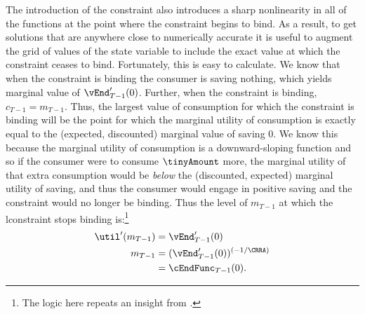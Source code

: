 \documentclass[titlepage]{\econtex}
\begin{document}

The introduction of the constraint also introduces a sharp
nonlinearity in all of the functions at the point where the constraint
begins to bind.  As a result, to get solutions that are anywhere close
to numerically accurate it is useful to augment the grid of values of
the state variable to include the exact value at which the constraint
ceases to bind.  Fortunately, this is easy to calculate.  We know that
when the constraint is binding the consumer is saving nothing, which
yields marginal value of $\vEnd_{T-1}^{\prime}(0)$. Further, when the
constraint is binding, ${c}_{T-1} = {m}_{T-1}$.  Thus, the largest
value of consumption for which the constraint is binding will be the
point for which the marginal utility of consumption is exactly equal
to the (expected, discounted) marginal value of saving 0.  We know
this because the marginal utility of consumption is a downward-sloping
function and so if the consumer were to consume $\tinyAmount$ more,
the marginal utility of that extra consumption would be \textit{below}
the (discounted, expected) marginal utility of saving, and thus the
consumer would engage in positive saving and the constraint would no
longer be binding.  Thus the level of ${m}_{T-1}$ at which the
lconstraint stops binding is:\footnote{The logic here repeats an insight from \cite{deatonLiqConstr}.}
\begin{equation}\begin{gathered}\begin{aligned}
  \util^{\prime}({m}_{T-1})  & = \vEnd_{T-1}^{\prime}(0)  \nonumber \\
  {m}_{T-1}  & = (\vEnd_{T-1}^{\prime}(0))^{(-1/\CRRA)}  \nonumber
  \\        & = \cEndFunc_{T-1}(0). \label{eq:LCbindsTm1}
\end{aligned}\end{gathered}\end{equation}
\end{document}
